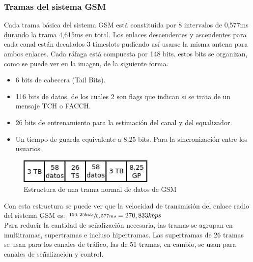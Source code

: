 \subsubsection{Tramas del sistema GSM}
\label{ssub:tramaGSM}
Cada trama básica del sistema GSM está constituida por 8 intervalos de 0,577ms durando la trama 4,615ms en total. Los enlaces descendentes y ascendentes para cada canal están decalados 3 timeslots pudiendo así usarse la misma antena para ambos enlaces. Cada ráfaga está compuesta por 148 bits. estos bits se organizan, como se puede ver en la imagen, de la siguiente forma.
\begin{itemize}
	\item 6 bits de cabecera (Tail Bits).
	\item 116 bits de datos, de los cuales 2 son flags que indican si se trata de un mensaje TCH o FACCH.
	\item 26 bits de entrenamiento para la estimación del canal y del equalizador.
	\item Un tiempo de guarda equivalente a 8,25 bits. Para la sincronización entre los usuarios.
\end{itemize} 
\begin{figure}[htp]
\centering
\includegraphics[width=0.6\textwidth]{Imagen/tramaGSM.jpg}
\caption{Estructura de una trama normal de datos de GSM}
\label{img:tramaGSM}
\end{figure}
Con esta estructura se puede ver que la velocidad de transmisión del enlace radio del sistema GSM es: $\sfrac{156,25bits}{0,577ms}=270,833kbps$\\
Para reducir la cantidad de señalización necesaria, las tramas se agrupan en multitramas, supertramas e incluso hipertramas. Las supertramas de 26 tramas se usan para los canales de tráfico, las de 51 tramas, en cambio, se usan para canales de señalización y control.
